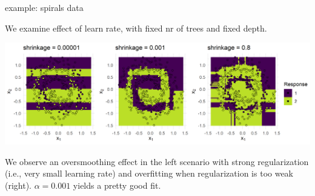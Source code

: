\begin{vbframe}{example: spirals data}

We examine effect of learn rate, with fixed nr of trees and fixed depth.

\vfill

\includegraphics[width = \textwidth]{figure/gbm_regu_oversmoothing_overfitting}

\vfill

We observe an oversmoothing effect in the left scenario with strong 
regularization (i.e., very small learning rate) and overfitting when 
regularization is too weak (right). $\alpha = 0.001$  yields a pretty good fit.

\end{vbframe}

